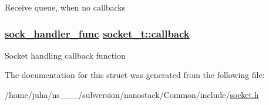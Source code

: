 Receive queue, when no callbacks \hypertarget{structsocket__t_e9c15a340c51976f69a600d9e2b7b716}{
\subsubsection[callback]{\setlength{\rightskip}{0pt plus 5cm}\hyperlink{socket_8h_7e2c49d774927dec68a715a09aaa3003}{sock\_\-handler\_\-func} \hyperlink{structsocket__t_e9c15a340c51976f69a600d9e2b7b716}{socket\_\-t::callback}}}
\label{structsocket__t_e9c15a340c51976f69a600d9e2b7b716}


Socket handling callback function 

The documentation for this struct was generated from the following file:\begin{CompactItemize}
\item 
/home/juha/ns\_\_\_/subversion/nanostack/Common/include/\hyperlink{socket_8h}{socket.h}\end{CompactItemize}
